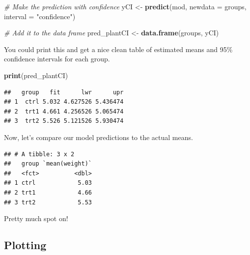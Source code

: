 \documentclass[
]{book}
\newenvironment{Shaded}{\begin{snugshade}}{\end{snugshade}}
\newcommand{\CommentTok}[1]{\textcolor[rgb]{0.56,0.35,0.01}{\textit{#1}}}
\newcommand{\DataTypeTok}[1]{\textcolor[rgb]{0.13,0.29,0.53}{#1}}
\newcommand{\KeywordTok}[1]{\textcolor[rgb]{0.13,0.29,0.53}{\textbf{#1}}}
\newcommand{\NormalTok}[1]{#1}
\newcommand{\OperatorTok}[1]{\textcolor[rgb]{0.81,0.36,0.00}{\textbf{#1}}}
\newcommand{\StringTok}[1]{\textcolor[rgb]{0.31,0.60,0.02}{#1}}
\begin{document}
\begin{Shaded}
\begin{Highlighting}[]
\CommentTok{# Make the prediction with confidence}
\NormalTok{yCI <-}\StringTok{ }\KeywordTok{predict}\NormalTok{(mod, }\DataTypeTok{newdata =}\NormalTok{ groups, }\DataTypeTok{interval =} \StringTok{"confidence"}\NormalTok{)}

\CommentTok{# Add it to the data frame}
\NormalTok{pred_plantCI <-}\StringTok{ }\KeywordTok{data.frame}\NormalTok{(groups, yCI)}
\end{Highlighting}
\end{Shaded}

You could print this and get a nice clean table of estimated means and 95\% confidence intervals for each group.

\begin{Shaded}
\begin{Highlighting}[]
\KeywordTok{print}\NormalTok{(pred_plantCI)}
\end{Highlighting}
\end{Shaded}

\begin{verbatim}
##   group   fit      lwr      upr
## 1  ctrl 5.032 4.627526 5.436474
## 2  trt1 4.661 4.256526 5.065474
## 3  trt2 5.526 5.121526 5.930474
\end{verbatim}

Now, let's compare our model predictions to the actual means.

\begin{Shaded}
\end{Shaded}

\begin{verbatim}
## # A tibble: 3 x 2
##   group `mean(weight)`
##   <fct>          <dbl>
## 1 ctrl            5.03
## 2 trt1            4.66
## 3 trt2            5.53
\end{verbatim}

Pretty much spot on!

\hypertarget{plotting}{%
\subsection{Plotting}\label{plotting}}
\end{document}

